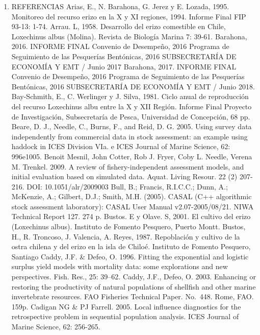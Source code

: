\documentclass[
]{article}
\providecommand{\tightlist}{%
  \setlength{\itemsep}{0pt}\setlength{\parskip}{0pt}}
\begin{document}
\begin{enumerate}
\def\labelenumi{\arabic{enumi}.}
\setcounter{enumi}{6}
\tightlist
\item
  REFERENCIAS Arias, E., N. Barahona, G. Jerez y E. Lozada, 1995.
  Monitoreo del recurso erizo en la X y XI regiones, 1994. Informe Final
  FIP 93-13: 1-74. Arrau. L, 1958. Desarrollo del erizo comestible en
  Chile, Loxechinus albus (Molina). Revista de Biología Marina 7: 39-61.
  Barahona, 2016. INFORME FINAL Convenio de Desempeño, 2016 Programa de
  Seguimiento de las Pesquerías Bentónicas, 2016 SUBSECRETARÍA DE
  ECONOMÍA Y EMT / Junio 2017 Barahona, 2017. INFORME FINAL Convenio de
  Desempeño, 2016 Programa de Seguimiento de las Pesquerías Bentónicas,
  2016 SUBSECRETARÍA DE ECONOMÍA Y EMT / Junio 2018. Bay-Schmith, E., C.
  Werlinger y J. Silva, 1981. Ciclo anual de reproducción del recurso
  Loxechinus albu entre la X y XII Región. Informe Final Proyecto de
  Investigación, Subsecretaría de Pesca, Universidad de Concepción, 68
  pp. Beare, D. J., Needle, C., Burns, F., and Reid, D. G. 2005. Using
  survey data independently from commercial data in stock assessment: an
  example using haddock in ICES Division VIa. e ICES Journal of Marine
  Science, 62: 996e1005. Benoit Mesnil, John Cotter, Rob J. Fryer, Coby
  L. Needle, Verena M. Trenkel. 2009. A review of fishery-independent
  assessment models, and initial evaluation based on simulated data.
  Aquat. Living Resour. 22 (2) 207-216. DOI: 10.1051/alr/2009003 Bull,
  B.; Francis, R.I.C.C.; Dunn, A.; McKenzie, A.; Gilbert, D.J.; Smith,
  M.H. (2005). CASAL (C++ algorithmic stock assessment laboratory):
  CASAL User Manual v2.07-2005/08/21. NIWA Technical Report 127. 274 p.
  Bustos. E y Olave. S, 2001. El cultivo del erizo (Loxechinus albus).
  Instituto de Fomento Pesquero, Puerto Montt. Bustos, H., R. Troncoso,
  J. Valencia, A. Reyes, 1987. Repoblación y cultivo de la ostra chilena
  y del erizo en la isla de Chiloé. Instituto de Fomento Pesquero,
  Santiago Caddy, J.F. \& Defeo, O. 1996. Fitting the exponential and
  logistic surplus yield models with mortality data: some explorations
  and new perspectives. Fish. Res., 25: 39--62. Caddy, J.F., Defeo, O.
  2003. Enhancing or restoring the productivity of natural populations
  of shellfish and other marine invertebrate resources. FAO Fisheries
  Technical Paper. No.~448. Rome, FAO. 159p. Cadigan NG \& PJ Farrell.
  2005. Local influence diagnostics for the retrospective problem in
  sequential population analysis. ICES Journal of Marine Science, 62:
  256-265.
\end{enumerate}
\end{document}
